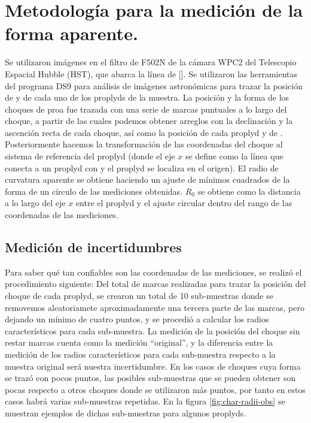 \section{Metodología para la medición de la forma aparente.}
\label{sec:methodology}
Se utilizaron imágenes en el filtro de F502N de la cámara WPC2 del Telescopio Espacial Hubble (HST), que abarca la línea de []. Se utilizaron las herramientas del programa DS9 para análisis de imágenes astronómicas para trazar la posición de \thC{} y de cada uno de los proplyds de la muestra. La posición y la forma de los choques de proa fue trazada con una serie de marcas puntuales a lo largo del choque, a partir de las cuales podemos obtener arreglos con la declinación y la ascención recta de cada choque, así como la posición de cada proplyd y de \thC{}. Posteriormente hacemos la transformación de las coordenadas del choque al sistema de referencia del proplyd (donde el eje $x$ se define como la línea que conecta a un proplyd con \thC{} y el proplyd se localiza en el origen). El radio de curvatura aparente se obtiene haciendo un ajuste de mínimos cuadrados de la forma de un círculo de las mediciones obtenidas. $R_0$ se obtiene como la distancia a lo largo del eje $x$ entre el proplyd y el ajuste circular dentro del rango de las coordenadas de las mediciones. 

\subsection{Medición de incertidumbres}

Para saber qué tan confiables son las coordenadas de las mediciones, se realizó el procedimiento siguiente: Del total de marcas realizadas para trazar la posición del choque de cada proplyd, se crearon un total de 10 sub-muestras donde se removemos aleatoriamete aproximadamente una tercera parte de las marcas, pero dejando un mínimo de cuatro puntos, y se procedió a calcular los radios característicos para cada sub-muestra. La medición de la posición del choque sin restar marcas cuenta como la medición ``original'', y la diferencia entre la medición de los radios característicos para cada sub-muestra respecto a la muestra original será nuestra incertidumbre. En los casos de choques cuya forma se trazó con pocos puntos, las posibles sub-muestras que se pueden obtener son pocas respecto a otros choques donde se utilizaron más puntos, por tanto en estos casos habrá varias sub-muestras repetidas. En la figura \ref{fig:char-radii-obs} se muestran ejemplos de dichas sub-muestras para algunos proplyds.


